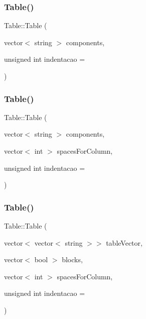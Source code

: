 \subsubsection{\texorpdfstring{Table()}{Table()}\hspace{0.1cm}{\footnotesize\ttfamily [1/4]}}
{\footnotesize\ttfamily Table\+::\+Table (\begin{DoxyParamCaption}\item[{vector$<$ string $>$}]{components,  }\item[{unsigned int}]{indentacao = {} }\end{DoxyParamCaption})}

\hypertarget{class_table_a65aecaa868a14218cbecb86437f996c1}{}\label{class_table_a65aecaa868a14218cbecb86437f996c1} 
\subsubsection{\texorpdfstring{Table()}{Table()}\hspace{0.1cm}{\footnotesize\ttfamily [2/4]}}
{\footnotesize\ttfamily Table\+::\+Table (\begin{DoxyParamCaption}\item[{vector$<$ string $>$}]{components,  }\item[{vector$<$ int $>$}]{spaces\+For\+Column,  }\item[{unsigned int}]{indentacao = {} }\end{DoxyParamCaption})}

\hypertarget{class_table_a9abee52d5b062c43f79bfe55c67b7759}{}\label{class_table_a9abee52d5b062c43f79bfe55c67b7759} 
\subsubsection{\texorpdfstring{Table()}{Table()}\hspace{0.1cm}{\footnotesize\ttfamily [3/4]}}
{\footnotesize\ttfamily Table\+::\+Table (\begin{DoxyParamCaption}\item[{vector$<$ vector$<$ string $>$$>$}]{table\+Vector,  }\item[{vector$<$ bool $>$}]{blocks,  }\item[{vector$<$ int $>$}]{spaces\+For\+Column,  }\item[{unsigned int}]{indentacao = {} }\end{DoxyParamCaption})}

